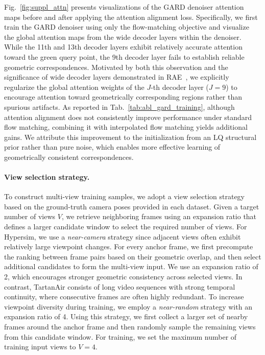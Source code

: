 Fig.~\ref{fig:suppl_attn} presents visualizations of the GARD denoiser attention maps before and after applying the attention alignment loss. Specifically, we first train the GARD denoiser using only the flow-matching objective and visualize the global attention maps from the wide decoder layers within the denoiser. While the 11th and 13th decoder layers exhibit relatively accurate attention toward the green query point, the 9th decoder layer fails to establish reliable geometric correspondences. Motivated by both this observation and the significance of wide decoder layers demonstrated in RAE~\cite{zheng2025diffusion}, we explicitly regularize the global attention weights of the $J$-th decoder layer ($J=9$) to encourage attention toward geometrically corresponding regions rather than spurious artifacts. As reported in Tab.~\ref{tab:abl_gard_training}, although attention alignment does not consistently improve performance under standard flow matching, combining it with interpolated flow matching yields additional gains. We attribute this improvement to the initialization from an LQ structural prior rather than pure noise, which enables more effective learning of geometrically consistent correspondences.




\paragraph{View selection strategy.}
To construct multi-view training samples, we adopt a view selection strategy based on the ground-truth camera poses provided in each dataset. Given a target number of views $V$, we retrieve neighboring frames using an expansion ratio that defines a larger candidate window to select the required number of views. For Hypersim, we use a \textit{near-camera} strategy since adjacent views often exhibit relatively large viewpoint changes. For every anchor frame, we first precompute the ranking between frame pairs based on their geometric overlap, and then select additional candidates to form the multi-view input. We use an expansion ratio of 2, which encourages stronger geometric consistency across selected views. In contrast, TartanAir consists of long video sequences with strong temporal continuity, where consecutive frames are often highly redundant. To increase viewpoint diversity during training, we employ a \textit{near-random} strategy with an expansion ratio of 4. Using this strategy, we first collect a larger set of nearby frames around the anchor frame and then randomly sample the remaining views from this candidate window. For training, we set the maximum number of training input views to $V=4$.

